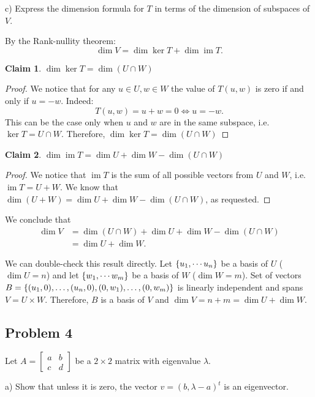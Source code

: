 \documentclass{article}
\theoremstyle{definition}
\newtheorem*{claim}{Claim}
\DeclareMathOperator{\im}{\operatorname{im}}
\DeclarePairedDelimiter\set{\{}{\}}
\begin{document}
\begin{tcolorbox}
c) Express the dimension formula for $T$ in terms of the dimension of subspaces of $V$.
\end{tcolorbox}

By the Rank-nullity theorem:
\[ \dim V = \dim \ker T + \dim \im T. \]

\begin{claim}
    $\dim \ker T = \dim (U \cap W)$
\end{claim}

\begin{proof}
We notice that for any $u \in U, w \in W$ the value of $T(u,w)$ is zero if and only if $u = - w$. Indeed:
\[ T(u,w) = u+w = 0 \iff u = -w. \]
This can be the case only when $u$ and $w$ are in the same subspace, i.e. $\ker T = U \cap W$.
Therefore, $\dim \ker T = \dim (U \cap W)$
\end{proof}

\begin{claim}
    $\dim \im T = \dim U + \dim W - \dim (U \cap W)$
\end{claim}

\begin{proof}
We notice that $\im T$ is the sum of all possible vectors from $U$ and $W$, i.e. $\im T = U+W$.
We know that $\dim(U+W) = \dim U + \dim W - \dim (U \cap W)$, as requested.
\end{proof}

We conclude that
\begin{align*}
    \dim V 
    & = \dim (U \cap W) + \dim U + \dim W - \dim (U \cap W) \\
    & = \dim U + \dim W.    
\end{align*}

We can double-check this result directly.
Let $\set{u_1, \cdots u_n}$ be a basis of $U$ ($\dim U = n$) and let $\set{w_1, \cdots w_m}$ be a basis of $W$ ($\dim W = m$).
Set of vectors $B = \set{(u_1,0),\dots,(u_n,0),(0,w_1),\dots,(0,w_m)}$ is linearly independent and spans $V = U \times W$. Therefore, $B$ is a basis of $V$ and $\dim V = n + m = \dim U + \dim W$.


\subsection*{Problem 4}

\begin{tcolorbox}
Let 
$
A =
\begin{bmatrix}
    a & b \\
    c & d
\end{bmatrix}
$
be a $2 \times 2$ matrix with eigenvalue $\lambda$.

a) Show that unless it is zero, the vector $v = (b, \lambda - a)^t$ is an eigenvector.
\end{tcolorbox}
\end{document}
